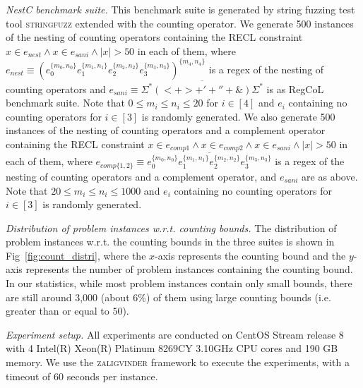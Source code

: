 \medskip
\noindent
\emph{NestC benchmark suite.} 
This benchmark suite is generated by string fuzzing test tool \textsc{stringfuzz} \cite{stringfuzz} extended with the counting operator. We generate 500 instances of the nesting of counting operators containing the RECL constraint $x\in e_{nest}\wedge x\in e_{sani}\wedge |x|>50$ in each of them, where $e_{nest}\equiv (e_0^{\{m_0,n_0\}}e_1^{\{m_1,n_1\}}e_2^{\{m_2,n_2\}}e_3^{\{m_3,n_3\}})^{\{m_4,n_4\}}$ is a regex of the nesting of counting operators and $e_{sani} \equiv \overline{\Sigma^*(<+ >+'+''+\&)\Sigma^*}$ is as RegCoL benchmark suite. Note that $0\leq m_i\leq n_i\leq 20$ for $i\in [4]$ and $e_i$ containing no counting operators for $i\in [3]$ is randomly generated.  We also generate 500 instances of the nesting of counting operators and a complement operator containing the RECL constraint $x\in e_{comp1}\wedge x\in e_{comp2} \wedge x\in e_{sani} \wedge |x|>50$ in each of them, where $e_{comp\{1,2\}}\equiv \overline{e_0^{\{m_0,n_0\}}e_1^{\{m_1,n_1\}}e_2^{\{m_2,n_2\}}e_3^{\{m_3,n_3\}}}$ is a regex of the nesting of counting operators and a complement operator, and $e_{sani}$ are as above. Note that $20\leq m_i\leq n_i\leq 1000$ and $e_i$  containing no counting operators for $i\in [3]$ is randomly generated.

\medskip
\noindent
\emph{Distribution of problem instances w.r.t. counting bounds. }
The distribution of problem instances w.r.t. the counting bounds in the three suites is shown in Fig~\ref{fig:count_distri}, where the $x$-axis represents the counting bound and the $y$-axis represents the number of problem instances containing the counting bound. 
In our statistics, while most problem instances contain only small bounds, there are still around 3,000  (about 6\%) of them using large counting bounds (i.e. greater than or equal to $50$).

\medskip
\noindent
\emph{Experiment setup.}
All experiments are conducted on CentOS Stream release 8 with 4 Intel(R) Xeon(R) Platinum 8269CY 3.10GHz CPU cores and 190 GB memory. We use the \textsc{zaligvinder} framework \cite{zaligvinder_2021} to execute the experiments, with a timeout of 60 seconds per instance.


